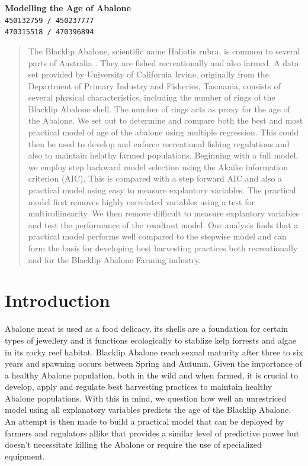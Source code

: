 \documentclass[9pt,twocolumn]{article}
\begin{document}
	\begin{center}
		\textbf{\Large Modelling the Age of Abalone} \\\vspace{4mm}
		\texttt{450132759 / 450237777\\470315518 / 470396894}
	\end{center}
	\begin{abstract}
		The Blacklip Abalone, scientific name Haliotis rubra, is common to several parts of Australia \cite{source}. They are fished recreationally and also farmed. A data set provided by University of California Irvine, originally from the Department of Primary Industry and Fisheries, Tasmania, consists of several physical characteristics, including the number of rings of the Blacklip Abalone shell. The number of rings acts as proxy for the age of the Abalone. We set out to determine and compare both the best and most practical model of age of the abalone using multiple regression. This could then be used to develop and enforce recreational fishing regulations and also to maintain helathy farmed populations. Beginning with a full model, we employ step backward model selection using the Akaike information criterion (AIC). This is compared with a step forward AIC and also a practical model using easy to measure explantory variables. The practical model first removes highly correlated variables using a test for multicollinearity. We then remove difficult to measure explantory variables and test the performance of the resultant model. Our analysis finds that a practical model performs well compared to the stepwise model and can form the basis for developing best harvesting practices both recreationally and for the Blacklip Abalone Farming industry.
	\end{abstract}

	\section{Introduction}
		Abalone meat is used as a food delicacy, its shells are a foundation for certain types of jewellery and it functions ecologically to stablize kelp forrests and algae in its rocky reef habitat. Blacklip Abalone reach sexual maturity after three to six years and spawning occurs between Spring and Autumn\cite{blacklip}. Given the importance of a healthy Abalone population, both in the wild and when farmed, it is crucial to develop, apply and regulate best harvesting practices to maintain healthy Abalone populations. With this in mind, we question how well an unrestriced model using all explanatory variables predicts the age of the Blacklip Abalone. An attempt is then made to build a practical model that can be deployed by farmers and regulators allike that provides a similar level of predictive power but doesn't necessitate killing the Abalone or require the use of specialized equipment.					
\end{document}
